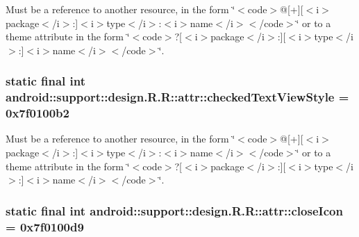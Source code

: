 Must be a reference to another resource, in the form \char`\"{}$<$code$>$@\mbox{[}+\mbox{]}\mbox{[}$<$i$>$package$<$/i$>$:\mbox{]}$<$i$>$type$<$/i$>$:$<$i$>$name$<$/i$>$$<$/code$>$\char`\"{} or to a theme attribute in the form \char`\"{}$<$code$>$?\mbox{[}$<$i$>$package$<$/i$>$:\mbox{]}\mbox{[}$<$i$>$type$<$/i$>$:\mbox{]}$<$i$>$name$<$/i$>$$<$/code$>$\char`\"{}. \hypertarget{classandroid_1_1support_1_1design_1_1_r_1_1attr_0e6b598e85baabfafc48c2756bdaf57e}{
\subsubsection[{checkedTextViewStyle}]{\setlength{\rightskip}{0pt plus 5cm}static final int android::support::design.R.R::attr::checkedTextViewStyle = 0x7f0100b2}}
\label{classandroid_1_1support_1_1design_1_1_r_1_1attr_0e6b598e85baabfafc48c2756bdaf57e}


Must be a reference to another resource, in the form \char`\"{}$<$code$>$@\mbox{[}+\mbox{]}\mbox{[}$<$i$>$package$<$/i$>$:\mbox{]}$<$i$>$type$<$/i$>$:$<$i$>$name$<$/i$>$$<$/code$>$\char`\"{} or to a theme attribute in the form \char`\"{}$<$code$>$?\mbox{[}$<$i$>$package$<$/i$>$:\mbox{]}\mbox{[}$<$i$>$type$<$/i$>$:\mbox{]}$<$i$>$name$<$/i$>$$<$/code$>$\char`\"{}. \hypertarget{classandroid_1_1support_1_1design_1_1_r_1_1attr_531c44d6ce4b890802074bcef225b66e}{
\subsubsection[{closeIcon}]{\setlength{\rightskip}{0pt plus 5cm}static final int android::support::design.R.R::attr::closeIcon = 0x7f0100d9}}
\label{classandroid_1_1support_1_1design_1_1_r_1_1attr_531c44d6ce4b890802074bcef225b66e}


